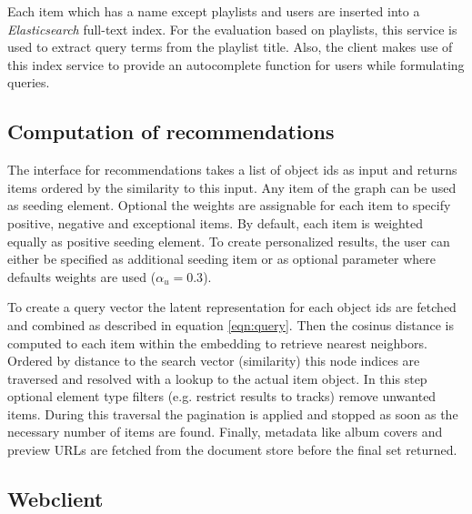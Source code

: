 \documentclass[sigconf]{acmart}
\begin{document}
Each item which has a name except playlists and users are inserted into a \emph{Elasticsearch} full-text index. For the evaluation based on playlists, this service is used to extract query terms from the playlist title. Also, the client makes use of this index service to provide an autocomplete function for users while formulating queries.

\subsection{Computation of recommendations}
The interface for recommendations takes a list of object ids as input and returns items ordered by the similarity to this input. Any item of the graph can be used as seeding element. Optional the weights are assignable for each item to specify positive, negative and exceptional items. By default, each item is weighted equally as positive seeding element. To create personalized results, the user can either be specified as additional seeding item or as optional parameter where defaults weights are used ($ \alpha_{u} = 0.3 $).

To create a query vector the latent representation for each object ids are fetched and combined as described in equation \ref{eqn:query}. Then the cosinus distance is computed to each item within the embedding to retrieve nearest neighbors. Ordered by distance to the search vector (similarity) this node indices are traversed and resolved with a lookup to the actual item object. In this step optional element type filters (e.g. restrict results to tracks) remove unwanted items. During this traversal the pagination is applied and stopped as soon as the necessary number of items are found. Finally, metadata like album covers and preview URLs are fetched from the document store before the final set returned.



\subsection{Webclient}

\end{document}
